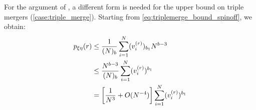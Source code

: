 \documentclass{article}
\begin{document}
For the argument of \citet{koskela2018}, a different form is needed for the upper bound on triple mergers (\ref{case:triple_merge}). Starting from \eqref{eq:triplemerge_bound_spinoff}, we obtain:
\begin{align}
p_{\xi\eta}(r) &\leq \frac{1}{(N)_b} \sum_{i=1}^{N} (v_{i}^{(r)})_{b_1} N^{b-3} \notag\\
&\leq \frac{N^{b-3}}{(N)_b} \sum_{i=1}^{N} (v_{i}^{(r)})^{b_1} \notag\\
&= \left[ \frac{1}{N^3} + O(N^{-4}) \right] \sum_{i=1}^{N} (v_{i}^{(r)})^{b_1}
\end{align}


\end{document}
